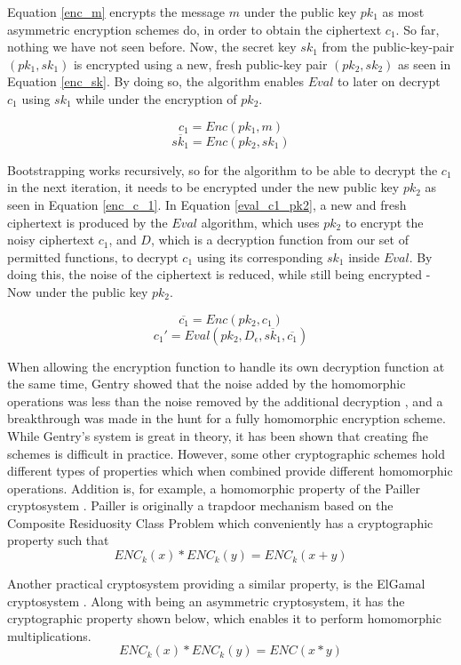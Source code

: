 Equation \ref{enc_m} encrypts the message $m$ under the public key $pk_1$ as most asymmetric encryption schemes do, in order to obtain the ciphertext $c_1$. So far, nothing we have not seen before. Now, the secret key $sk_1$ from the public-key-pair $(pk_1,sk_1)$ is encrypted using a new, fresh public-key pair $(pk_2, sk_2)$ as seen in Equation \ref{enc_sk}. By doing so, the algorithm enables $Eval$ to later on decrypt $c_1$ using $sk_1$ while under the encryption of $pk_2$.

\begin{equation}
\label{enc_m}
c_1 = Enc(pk_1, m)
\end{equation}
\begin{equation}
\label{enc_sk}
\overline{sk_1} = Enc(pk_2, sk_1)
\end{equation}

Bootstrapping works recursively, so for the algorithm to be able to decrypt the $c_1$ in the next iteration, it needs to be encrypted under the new public key $pk_2$ as seen in Equation \ref{enc_c_1}. In Equation \ref{eval_c1_pk2}, a new and fresh ciphertext is produced by the $Eval$ algorithm, which uses $pk_2$ to encrypt the noisy ciphertext $c_1$, and $D$, which is a decryption function from our set of permitted functions, to decrypt $c_1$ using its corresponding $sk_1$ inside $Eval$. By doing this, the noise of the ciphertext is reduced, while still being encrypted - Now under the public key $pk_2$. 

\begin{equation}
\label{enc_c_1}
\overline{c_1} = Enc(pk_2, c_1)
\end{equation}
\begin{equation}
\label{eval_c1_pk2}
c_1' = Eval(pk_2, D_{\epsilon}, \overline{sk_1}, \overline{c_1})
\end{equation}

When allowing the encryption function to handle its own decryption function at the same time, Gentry showed that the noise added by the homomorphic operations was less than the noise removed by the additional decryption \cite{Gentry_computing_arb_func_enc_data}, and a breakthrough was made in the hunt for a fully homomorphic encryption scheme. While Gentry's system is great in theory, it has been shown that creating \gls{fhe} schemes is difficult in practice. However, some other cryptographic schemes hold different types of properties which when combined provide different homomorphic operations. Addition is, for example, a homomorphic property of the Pailler cryptosystem \citep{Paillier}. Pailler is originally a trapdoor mechanism based on the Composite Residuosity Class Problem which conveniently has a cryptographic property such that \[ENC_k(x) * ENC_k(y) = ENC_k(x + y)\]

Another practical cryptosystem providing a similar property, is the ElGamal cryptosystem \cite{elgamal}. Along with being an asymmetric cryptosystem, it has the cryptographic property shown below, which enables it to perform homomorphic multiplications.  \[ENC_k(x) * ENC_k(y) = ENC(x * y)\]


